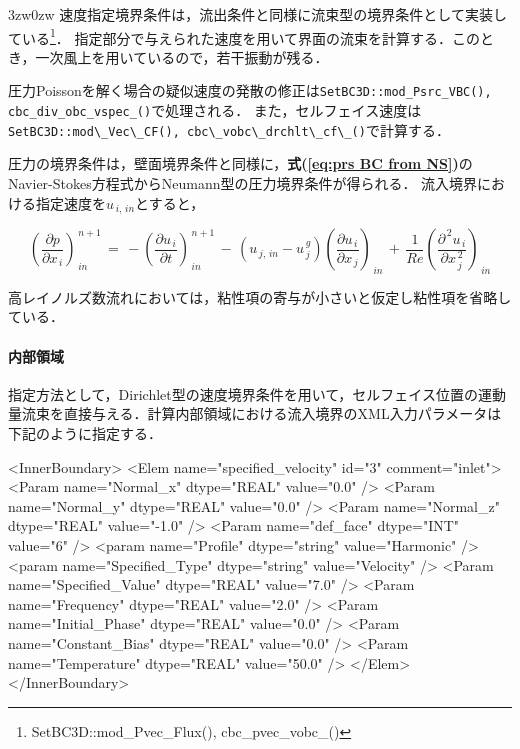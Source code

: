 \begin{indentation}{3zw}{0zw}
速度指定境界条件は，流出条件と同様に流束型の境界条件として実装している\footnote{SetBC3D::mod\_Pvec\_Flux(), cbc\_pvec\_vobc\_()}．
指定部分で与えられた速度を用いて界面の流束を計算する．このとき，一次風上を用いているので，若干振動が残る．

圧力Poissonを解く場合の疑似速度の発散の修正は\verb|SetBC3D::mod_Psrc_VBC(), cbc_div_obc_vspec_()|で処理される．
また，セルフェイス速度は\verb|SetBC3D::mod\_Vec\_CF(), cbc\_vobc\_drchlt\_cf\_()|で計算する．

圧力の境界条件は，壁面境界条件と同様に，\textbf{式(\ref{eq:prs BC from NS})}のNavier-Stokes方程式からNeumann型の圧力境界条件が得られる．
流入境界における指定速度を$u_{\,i,\,in}$とすると，

\begin{equation}
{\left( \frac{\partial p}{\partial x_{\,i}}\right)}^{\,n+1}_{\,in} \,=\, - {\left( \frac{\partial u_{\,i}}{\partial t}\right)}^{\,n+1}_{\,in}
\,-\, \left( u_{\,j,\,in}-u_{\,j}^{\,g} \right) {\left( \frac{\partial u_{\,i}}{\partial x_{\,j}}\right)}_{\,in}
\,+\, \frac{1}{Re} {\left( \frac{\partial^{\,2} u_{\,i}}{\partial x_{\,j}^{\,2}} \right)}_{\,in}
\label{eq:prs inflow BC from NS}
\end{equation}

\noindent 高レイノルズ数流れにおいては，粘性項の寄与が小さいと仮定し粘性項を省略している．



\paragraph{内部領域}

指定方法として，Dirichlet型の速度境界条件を用いて，セルフェイス位置の運動量流束を直接与える．計算内部領域における流入境界のXML入力パラメータは下記のように指定する．

{\small
\begin{program}
<InnerBoundary> 
  <Elem name="specified_velocity" id="3" comment="inlet">
    <Param name="Normal_x"        dtype="REAL"   value="0.0" />
    <Param name="Normal_y"        dtype="REAL"   value="0.0" />
    <Param name="Normal_z"        dtype="REAL"   value="-1.0" />
    <Param name="def_face"        dtype="INT"    value="6" />
    <param name="Profile"         dtype="string" value="Harmonic" />
    <param name="Specified_Type"  dtype="string" value="Velocity" />
    <Param name="Specified_Value" dtype="REAL"   value="7.0" />
    <Param name="Frequency"       dtype="REAL"   value="2.0" />
    <Param name="Initial_Phase"   dtype="REAL"   value="0.0" />
    <Param name="Constant_Bias"   dtype="REAL"   value="0.0" />
    <Param name="Temperature"     dtype="REAL"   value="50.0" />
  </Elem>
</InnerBoundary>
\end{program}
}


\end{indentation}
